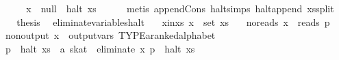 \begin{isabellebody}
\ \ \isamarkupfalse%
\ \isamarkupfalse%
\ {}{}{}{}\ {}\ x\ {}{}\ null\ {}\ halt\ xs{}\isanewline
\ \ \ \ \isamarkupfalse%
\ {}metis\ append{}Cons\ halt{}simps{}{}{}\ halt{}append\ xs{}split{}\isanewline
\ \ \isamarkupfalse%
\ \isamarkupfalse%
\ {}thesis\ \isamarkupfalse%
\isanewline
{}\isamarkupfalse%
%
\endisatagproof
{\isafoldproof}%
%
\isadelimproof
\isanewline
%
\endisadelimproof
\isanewline
{}\isamarkupfalse%
\ eliminate{}variables{}halt{}\isanewline
\ \ \ x{}in{}xs{}\ {}x\ {}\ set\ xs{}\isanewline
\ \ \ no{}reads{}\ {}x\ {}\ reads\ p{}\isanewline
\ \ \ non{}output{}\ {}x\ {}\ output{}vars\ TYPE{}{}a{}{}ranked{}alphabet{}\ {}\isanewline
\ \ \ {}{}p{}\ {}\ {}halt\ xs\ {}{}\ {}a\ skat{}\ {}\ {}eliminate\ x\ p{}\ {}\ halt\ xs{}\isanewline

\end{isabellebody}
